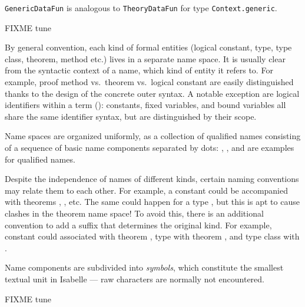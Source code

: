 \begin{isabellebody}
\begin{isamarkuptext}
\begin{description}
  \item \verb|GenericDataFun| is analogous to
  \verb|TheoryDataFun| for type \verb|Context.generic|.

  \end{description}%
\end{isamarkuptext}%
\isamarkuptrue%
%
\endisatagmlref
{\isafoldmlref}%
%
\isadelimmlref
%
\endisadelimmlref
%
\isamarkuptrue%
%
\isadelimFIXME
%
\endisadelimFIXME
%
\isatagFIXME
%
\begin{isamarkuptext}%
FIXME tune

  By general convention, each kind of formal entities (logical
  constant, type, type class, theorem, method etc.) lives in a
  separate name space.  It is usually clear from the syntactic context
  of a name, which kind of entity it refers to.  For example, proof
  method  vs.\ theorem  vs.\ logical
  constant  are easily distinguished thanks to the design
  of the concrete outer syntax.  A notable exception are logical
  identifiers within a term (): constants, fixed
  variables, and bound variables all share the same identifier syntax,
  but are distinguished by their scope.

  Name spaces are organized uniformly, as a collection of qualified
  names consisting of a sequence of basic name components separated by
  dots: , , and 
  are examples for qualified names.

  Despite the independence of names of different kinds, certain naming
  conventions may relate them to each other.  For example, a constant
   could be accompanied with theorems , ,  etc.  The same
  could happen for a type , but this is apt to cause
  clashes in the theorem name space!  To avoid this, there is an
  additional convention to add a suffix that determines the original
  kind.  For example, constant  could associated with
  theorem , type  with theorem , and type class  with .

  \medskip Name components are subdivided into \emph{symbols}, which
  constitute the smallest textual unit in Isabelle --- raw characters
  are normally not encountered.%
\end{isamarkuptext}%
\isamarkuptrue%
%
\endisatagFIXME
{\isafoldFIXME}%
%
\isadelimFIXME
%
\endisadelimFIXME
%
\isamarkuptrue%
%
\isadelimFIXME
%
\endisadelimFIXME
%
\isatagFIXME
%
\begin{isamarkuptext}%
FIXME tune


\end{isamarkuptext}
\end{isabellebody}
